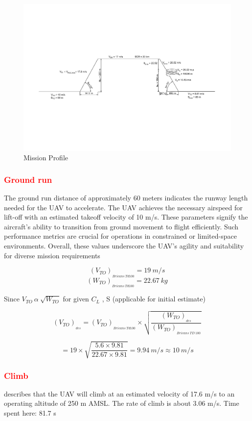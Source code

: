 \documentclass[12 pt]{article}
\begin{document}
\begin{figure}[h]
    \centering
    \includegraphics[width = \linewidth]{Drawing1-Model_final.pdf}
    \caption{Mission Profile}
    \label{Mission Profile}
\end{figure}


\subsubsection{\textcolor{red}{Ground run}}
The ground run distance of approximately 60 meters indicates the runway length needed for the UAV to accelerate. The UAV achieves the necessary airspeed for lift-off with an estimated takeoff velocity of 10 m/s. These parameters signify the aircraft's ability to transition from ground movement to flight efficiently. Such performance metrics are crucial for operations in constrained or limited-space environments. Overall, these values underscore the UAV's agility and suitability for diverse mission requirements \cite{EgglestonUnknownTitle2015}

$$ (V_{TO})_{_{Bricans \: Td100}} = 19 \: m/s$$
$$ (W_{TO})_{_{Bricans \: Td100}} = 22.67 \: kg$$

Since $ V_{TO} \: \alpha \: \sqrt{W_{TO}} $ for given $C_L$ , S (applicable for initial estimate)

$$ (V_{TO})_{_{des}} = (V_{TO})_{_{Bricans \: Td100}} \times \sqrt{\frac{(W_{TO})_{_{des}}}{(W_{TO})_{_{Bricans \: TD \: 100}}}} $$

$$ = 19 \times \sqrt{\frac{5.6 \times 9.81}{22.67 \times 9.81}} = 9.94 \: m/s \approx 10 \: m/s $$

\subsubsection{\textcolor{red}{Climb}} 
\cite{1000_questions}describes that the UAV will climb at an estimated velocity of 17.6 m/s to an operating altitude of 250 m AMSL. The rate of climb is about 3.06 m/s. Time spent here: 81.7 s
\end{document}
